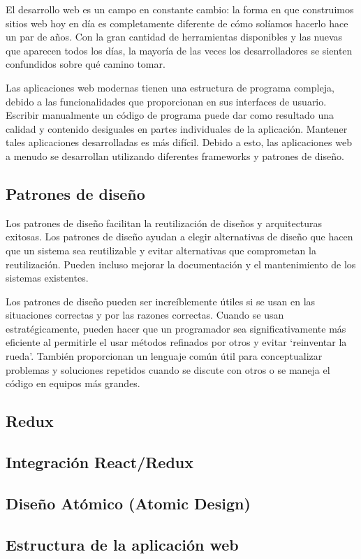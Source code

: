 El desarrollo web es un campo en constante cambio: la forma en que construimos sitios web hoy en día es completamente diferente de cómo solíamos hacerlo hace un par de años. Con la gran cantidad de herramientas disponibles y las nuevas que aparecen todos los días, la mayoría de las veces los desarrolladores se sienten confundidos sobre qué camino tomar.
\vspace{0.8cm}

Las aplicaciones web modernas tienen una estructura de programa compleja, debido a las funcionalidades que proporcionan en sus interfaces de usuario. Escribir manualmente un código de programa puede dar como resultado una calidad y contenido desiguales en partes individuales de la aplicación. Mantener tales aplicaciones desarrolladas es más difícil. Debido a esto, las aplicaciones web a menudo se desarrollan utilizando diferentes frameworks y patrones de diseño.

\subsection{Patrones de diseño}
Los patrones de diseño facilitan la reutilización de diseños y arquitecturas exitosas. Los patrones de diseño ayudan a elegir alternativas de diseño que hacen que un sistema sea reutilizable y evitar alternativas que comprometan la reutilización. Pueden incluso mejorar la documentación y el mantenimiento de los sistemas existentes.
\vspace{0.8cm}

Los patrones de diseño pueden ser increíblemente útiles si se usan en las situaciones correctas y por las razones correctas. Cuando se usan estratégicamente, pueden hacer que un programador sea significativamente más eficiente al permitirle el usar métodos refinados por otros y evitar `reinventar la rueda'. También proporcionan un lenguaje común útil para conceptualizar problemas y soluciones repetidos cuando se discute con otros o se maneja el código en equipos más grandes.

\subsection{Redux}


\subsection{Integración React/Redux}


\subsection{Diseño Atómico (Atomic Design)}


\subsection{Estructura de la aplicación web}
